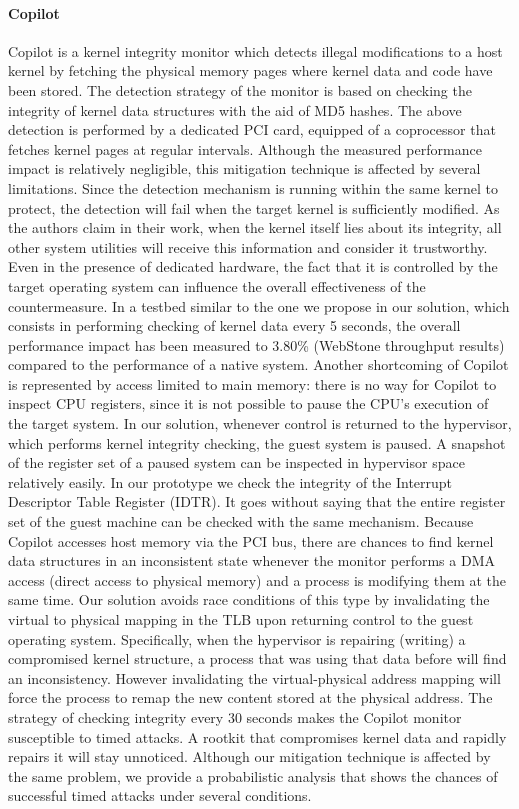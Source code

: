\paragraph{Copilot}
Copilot \cite{copilot} is a kernel integrity monitor which detects illegal modifications to a host kernel by fetching the physical memory pages where kernel data and code have been stored. The detection strategy of the monitor is based on checking the integrity of kernel data structures with the aid of MD5 hashes. The above detection is performed by a dedicated PCI card, equipped of a coprocessor that fetches kernel pages at regular intervals. Although the measured performance impact is relatively negligible, this mitigation technique is affected by several limitations. Since the detection mechanism is running within the same kernel to protect, the detection will fail when the target kernel is sufficiently modified. As the authors claim in their work, when the kernel itself lies about its integrity, all other system utilities will receive this information and consider it trustworthy. Even in the presence of dedicated hardware, the fact that it is controlled by the target operating system can influence the overall effectiveness of the countermeasure. 
In a testbed similar to the one we propose in our solution, which consists in performing checking of kernel data  every 5 seconds, the overall performance impact has been measured to 3.80\% (WebStone throughput results) compared to the performance of a native system.   
Another shortcoming of Copilot is represented by access limited to main memory: there is no way for Copilot to inspect CPU registers, since it is not possible to pause the CPU's execution of the target system. In our solution, whenever control is returned to the hypervisor, which performs kernel integrity checking, the guest system is paused. A snapshot of the register set of a paused system can be inspected in hypervisor space relatively easily. In our prototype we check the integrity of the Interrupt Descriptor Table Register (IDTR). It goes without saying that the entire register set of the guest machine can be checked with the same mechanism. 
Because Copilot accesses host memory via the PCI bus, there are chances to find kernel data structures in an inconsistent state whenever the monitor performs a DMA access (direct access to physical memory) and a process is modifying them at the same time. Our solution avoids race conditions of this type by invalidating the virtual to physical mapping in the TLB upon returning control to the guest operating system. Specifically, when the hypervisor is repairing (writing) a compromised kernel structure, a process that was using that data before will find an inconsistency. However invalidating the virtual-physical address mapping will force the process to remap the new content stored at the physical address.
The strategy of checking integrity every 30 seconds makes the Copilot monitor susceptible to timed attacks. A rootkit that compromises kernel data and rapidly repairs it will stay unnoticed. Although our mitigation technique is affected by the same problem, we provide a probabilistic analysis that shows the chances of successful timed attacks under several conditions.

